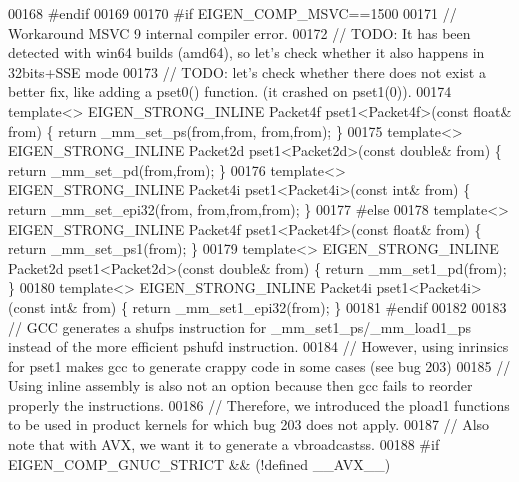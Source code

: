 \begin{DoxyCode}
00168 \textcolor{preprocessor}{#endif}
00169 
00170 \textcolor{preprocessor}{#if EIGEN\_COMP\_MSVC==1500}
00171 \textcolor{comment}{// Workaround MSVC 9 internal compiler error.}
00172 \textcolor{comment}{// TODO: It has been detected with win64 builds (amd64), so let's check whether it also happens in
       32bits+SSE mode}
00173 \textcolor{comment}{// TODO: let's check whether there does not exist a better fix, like adding a pset0() function. (it crashed
       on pset1(0)).}
00174 \textcolor{keyword}{template}<> EIGEN\_STRONG\_INLINE Packet4f pset1<Packet4f>(\textcolor{keyword}{const} \textcolor{keywordtype}{float}&  from) \{ \textcolor{keywordflow}{return} \_mm\_set\_ps(from,from,
      from,from); \}
00175 \textcolor{keyword}{template}<> EIGEN\_STRONG\_INLINE Packet2d pset1<Packet2d>(\textcolor{keyword}{const} \textcolor{keywordtype}{double}& from) \{ \textcolor{keywordflow}{return} \_mm\_set\_pd(from,from);
       \}
00176 \textcolor{keyword}{template}<> EIGEN\_STRONG\_INLINE Packet4i pset1<Packet4i>(\textcolor{keyword}{const} \textcolor{keywordtype}{int}&    from) \{ \textcolor{keywordflow}{return} \_mm\_set\_epi32(from,
      from,from,from); \}
00177 \textcolor{preprocessor}{#else}
00178 \textcolor{keyword}{template}<> EIGEN\_STRONG\_INLINE Packet4f pset1<Packet4f>(\textcolor{keyword}{const} \textcolor{keywordtype}{float}&  from) \{ \textcolor{keywordflow}{return} \_mm\_set\_ps1(from); \}
00179 \textcolor{keyword}{template}<> EIGEN\_STRONG\_INLINE Packet2d pset1<Packet2d>(\textcolor{keyword}{const} \textcolor{keywordtype}{double}& from) \{ \textcolor{keywordflow}{return} \_mm\_set1\_pd(from); \}
00180 \textcolor{keyword}{template}<> EIGEN\_STRONG\_INLINE Packet4i pset1<Packet4i>(\textcolor{keyword}{const} \textcolor{keywordtype}{int}&    from) \{ \textcolor{keywordflow}{return} \_mm\_set1\_epi32(from); 
      \}
00181 \textcolor{preprocessor}{#endif}
00182 
00183 \textcolor{comment}{// GCC generates a shufps instruction for \_mm\_set1\_ps/\_mm\_load1\_ps instead of the more efficient pshufd
       instruction.}
00184 \textcolor{comment}{// However, using inrinsics for pset1 makes gcc to generate crappy code in some cases (see bug 203)}
00185 \textcolor{comment}{// Using inline assembly is also not an option because then gcc fails to reorder properly the instructions.}
00186 \textcolor{comment}{// Therefore, we introduced the pload1 functions to be used in product kernels for which bug 203 does not
       apply.}
00187 \textcolor{comment}{// Also note that with AVX, we want it to generate a vbroadcastss.}
00188 \textcolor{preprocessor}{#if EIGEN\_COMP\_GNUC\_STRICT && (!defined \_\_AVX\_\_)}

\end{DoxyCode}
